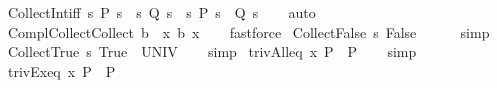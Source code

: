 \begin{isabellebody}
\ CollectInt{\isacharunderscore}iff{\isacharcolon}\ {\isachardoublequoteopen}{\isacharbraceleft}s{\isachardot}\ P\ s{\isacharbraceright}\ {\isasyminter}\ {\isacharbraceleft}s{\isachardot}\ Q\ s{\isacharbraceright}\ {\isacharequal}\ {\isacharbraceleft}s{\isachardot}\ P\ s\ {\isasymand}\ Q\ s{\isacharbraceright}{\isachardoublequoteclose}\isanewline
%
\isadelimproof
\ \ %
\endisadelimproof
%
\isatagproof
{}\isamarkupfalse%
\ auto%
\endisatagproof
{\isafoldproof}%
%
\isadelimproof
\isanewline
%
\endisadelimproof
\isanewline
{}\isamarkupfalse%
\ Compl{\isacharunderscore}Collect{\isacharcolon}{\isachardoublequoteopen}{\isacharminus}{\isacharparenleft}Collect\ b{\isacharparenright}\ {\isacharequal}\ {\isacharbraceleft}x{\isachardot}\ {\isasymnot}{\isacharparenleft}b\ x{\isacharparenright}{\isacharbraceright}{\isachardoublequoteclose}\isanewline
%
\isadelimproof
\ \ %
\endisadelimproof
%
\isatagproof
{}\isamarkupfalse%
\ fastforce%
\endisatagproof
{\isafoldproof}%
%
\isadelimproof
\isanewline
%
\endisadelimproof
\isanewline
{}\isamarkupfalse%
\ Collect{\isacharunderscore}False{\isacharcolon}\ {\isachardoublequoteopen}{\isacharbraceleft}s{\isachardot}\ False{\isacharbraceright}\ {\isacharequal}\ {\isacharbraceleft}{\isacharbraceright}{\isachardoublequoteclose}\isanewline
%
\isadelimproof
\ \ %
\endisadelimproof
%
\isatagproof
{}\isamarkupfalse%
\ simp%
\endisatagproof
{\isafoldproof}%
%
\isadelimproof
\isanewline
%
\endisadelimproof
\isanewline
{}\isamarkupfalse%
\ Collect{\isacharunderscore}True{\isacharcolon}\ {\isachardoublequoteopen}{\isacharbraceleft}s{\isachardot}\ True{\isacharbraceright}\ {\isacharequal}\ UNIV{\isachardoublequoteclose}\isanewline
%
\isadelimproof
\ \ %
\endisadelimproof
%
\isatagproof
{}\isamarkupfalse%
\ simp%
\endisatagproof
{\isafoldproof}%
%
\isadelimproof
\isanewline
%
\endisadelimproof
\isanewline
{}\isamarkupfalse%
\ triv{\isacharunderscore}All{\isacharunderscore}eq{\isacharcolon}\ {\isachardoublequoteopen}{\isasymforall}x{\isachardot}\ P\ {\isasymequiv}\ P{\isachardoublequoteclose}\isanewline
%
\isadelimproof
\ \ %
\endisadelimproof
%
\isatagproof
{}\isamarkupfalse%
\ simp%
\endisatagproof
{\isafoldproof}%
%
\isadelimproof
\isanewline
%
\endisadelimproof
\isanewline
{}\isamarkupfalse%
\ triv{\isacharunderscore}Ex{\isacharunderscore}eq{\isacharcolon}\ {\isachardoublequoteopen}{\isasymexists}x{\isachardot}\ P\ {\isasymequiv}\ P{\isachardoublequoteclose}\isanewline
%
\isadelimproof
\ \ %
\endisadelimproof

\end{isabellebody}
